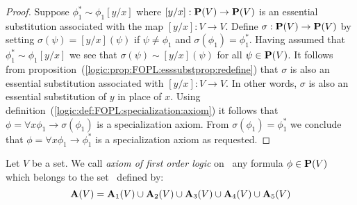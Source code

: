 \begin{proof}
Suppose $\phi_{1}^{*}\sim\phi_{1}[y/x]$ where $[y/x]:\mbox{${\bf P}(V)$}\to\mbox{${\bf P}(V)$}$ is
an essential substitution associated with the map $[y/x]:V\to V$.
Define $\sigma:\mbox{${\bf P}(V)$}\to\mbox{${\bf P}(V)$}$ by setting $\sigma(\psi)=[y/x](\psi)$ if
$\psi\neq\phi_{1}$ and $\sigma(\phi_{1})=\phi_{1}^{*}$. Having
assumed that $\phi_{1}^{*}\sim\phi_{1}[y/x]$ we see that
$\sigma(\psi)\sim[y/x](\psi)$ for all $\psi\in\mbox{${\bf P}(V)$}$. It follows from
proposition~(\ref{logic:prop:FOPL:esssubstprop:redefine}) that
$\sigma$ is also an essential substitution associated with
$[y/x]:V\to V$. In other words, $\sigma$ is also an essential
substitution of $y$ in place of $x$. Using
definition~(\ref{logic:def:FOPL:specialization:axiom}) it follows
that $\phi=\forall x\phi_{1}\to\sigma(\phi_{1})$ is a specialization
axiom. From $\sigma(\phi_{1})=\phi_{1}^{*}$ we conclude that
$\phi=\forall x\phi_{1}\to\phi_{1}^{*}$ is a specialization axiom as
requested.
\end{proof}
\begin{defin}\label{logic:def:FOPL:first:order:axiom}
Let $V$ be a set. We call {\em axiom of first order logic} on \pv\
any formula $\phi\in\mbox{${\bf P}(V)$}$ which belongs to the set \av\ defined by:
    \[
    \mbox{${\bf A}(V)$}={\bf A}_{1}(V)\cup{\bf A}_{2}(V)\cup{\bf A}_{3}(V)\cup{\bf A}_{4}(V)
    \cup{\bf A}_{5}(V)
    \]
\end{defin}

